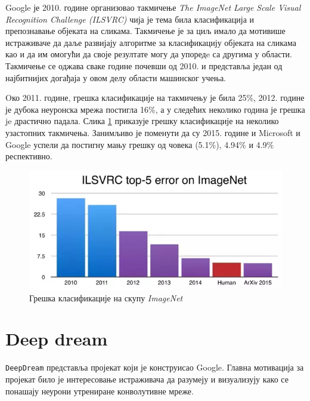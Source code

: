 \documentclass[a4paper]{article}
\begin{document}
Google је 2010. године организовао такмичење \textit{The ImageNet Large Scale Visual Recognition Challenge (ILSVRC)}
чија је тема била класификација и препознавање објеката на сликама. Такмичење је за циљ имало да мотивише истраживаче
да даље развијају алгоритме за класификацију објеката на сликама као и да им омогући да своје резултате
могу да упоредe са другима у области. Такмичење се оджава сваке године почевши од 2010. и представља један од
најбитнијих догађаја у овом делу области машинског учења.

Oко 2011. године, грешка класификације на такмичењу је била 25\%, 2012. године је дубока
неуронска мрежа постигла 16\%, а у следећих неколико година је грешка je драстично падала. Слика \ref{fig:imgneterror}
приказује грешку класификације на неколико узастопних такмичења. Занимљиво је поменути да су 2015. године и Microsoft
и Google успели да постигну мању грешку од човека (5.1\%), 4.94\% и 4.9\% респективно.

\begin{figure}[h!]
\begin{center}
    \includegraphics[width=\textwidth]{resources/ilsvrc.png}
\end{center}
\caption{Грешка класификације на скупу \textit{ImageNet}}
\label{fig:imgneterror}
\end{figure}



\section{Deep dream}
\label{sec:deepdream}
\texttt{DeepDream} представља пројекат који је конструисао Google. Главна мотивација за пројекат било је
интересовање истраживача да разумеју и визуализују како се понашају неурони утрениране конволутивне
мреже.
\end{document}
